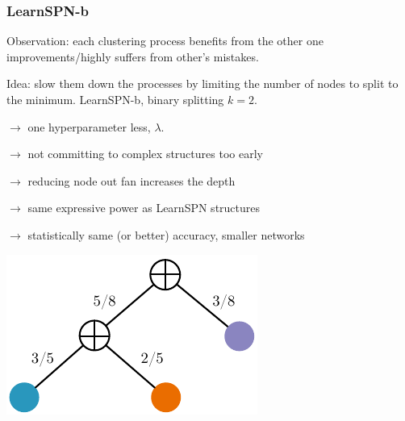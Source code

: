 \documentclass[10pt, t, xcolor={usenames,dvipsnames,svgnames}, compress]{beamer}
\begin{document}
\begin{frame}
  \frametitle{LearnSPN-b}
  Observation: each clustering process benefits from the other one improvements/highly suffers
  from other's mistakes.\par\bigskip

  Idea: slow them down the processes by limiting the number of
  nodes to split to the minimum.
  \textsf{LearnSPN-b}, binary splitting $k=2$.\par%

  $\rightarrow$ one hyperparameter less, $\lambda$.\par%
  $\rightarrow$ not committing to complex structures too early\par
  $\rightarrow$ reducing node out fan increases the depth\par
  $\rightarrow$ same expressive power as LearnSPN structures\par
  $\rightarrow$ statistically same (or better) accuracy, smaller
  networks\par%
  \begin{center}
    \raisebox{30pt}{\hspace{20pt}\Huge$=$\hspace{10pt}}
    \includegraphics[width=0.3\linewidth]{figures/learnspn-4-w.pdf}
  \end{center}

%
  \end{frame}
\end{document}

